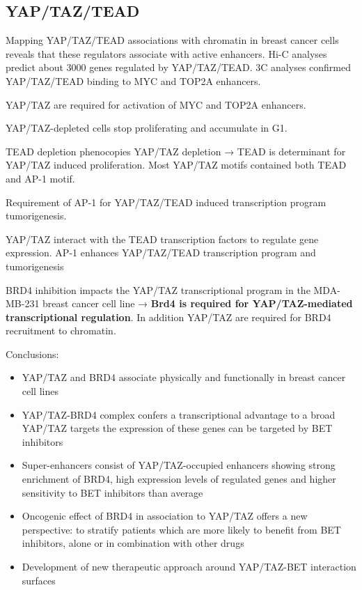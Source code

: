 \hypertarget{yaptaztead}{%
\subsection{YAP/TAZ/TEAD}\label{yaptaztead}}

Mapping YAP/TAZ/TEAD associations with chromatin in breast cancer cells reveals that these regulators associate with active enhancers. Hi-C analyses predict about 3000 genes regulated by YAP/TAZ/TEAD. 3C analyses confirmed YAP/TAZ/TEAD binding to MYC and TOP2A enhancers.

YAP/TAZ are required for activation of MYC and TOP2A enhancers.

YAP/TAZ-depleted cells stop proliferating and accumulate in G1.

TEAD depletion phenocopies YAP/TAZ depletion → TEAD is determinant for YAP/TAZ induced proliferation. Most YAP/TAZ motifs contained both TEAD and AP-1 motif.

Requirement of AP-1 for YAP/TAZ/TEAD induced transcription program tumorigenesis.

YAP/TAZ interact with the TEAD transcription factors to regulate gene expression. AP-1 enhances YAP/TAZ/TEAD transcription program and tumorigenesis

BRD4 inhibition impacts the YAP/TAZ transcriptional program in the MDA-MB-231 breast cancer cell line → \textbf{Brd4 is required for YAP/TAZ-mediated transcriptional regulation}. In addition YAP/TAZ are required for BRD4 recruitment to chromatin.

Conclusions:

\begin{itemize}
\tightlist
\item
  YAP/TAZ and BRD4 associate physically and functionally in breast cancer cell lines
\item
  YAP/TAZ-BRD4 complex confers a transcriptional advantage to a broad YAP/TAZ targets the expression of these genes can be targeted by BET inhibitors
\item
  Super-enhancers consist of YAP/TAZ-occupied enhancers showing strong enrichment of BRD4, high expression levels of regulated genes and higher sensitivity to BET inhibitors than average
\item
  Oncogenic effect of BRD4 in association to YAP/TAZ offers a new perspective:
  to stratify patients which are more likely to benefit from BET inhibitors, alone or in combination with other drugs
\item
  Development of new therapeutic approach around YAP/TAZ-BET interaction surfaces
\end{itemize}


